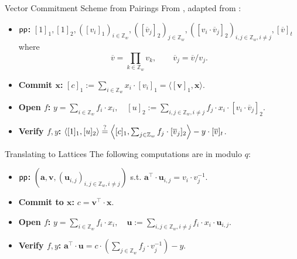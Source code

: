 \begin{frame}{Vector Commitment Scheme from Pairings}
	From \cite{AlbrechtCLMT22}, adapted from \cite{CatalanoF13, LibertRY16,LaiM19}:\pause
	\begin{itemize}
		\item \textbf{$\textsf{pp}$:} $[1]_1, [1]_2, ([v_i]_1)_{i\in \mathbb{Z}_w}, ([\overline{v}_j]_2)_{j \in \mathbb{Z}_w}, ([v_i \cdot \overline{v}_j]_2)_{i, j \in \mathbb{Z}_w, i\not=j}, [\overline{v}]_t$ where 
		\begin{equation*}
			\overline{v} = \prod_{k \in \mathbb{Z}_w}v_k,\qquad \overline{v}_j = \overline{v}/v_j.
		\end{equation*}\pause
		\item \textbf{Commit $\mathbf{x}$:} $[c]_1 := \sum_{i \in \mathbb{Z}_w} x_i \cdot [v_i]_1 = \langle[\mathbf{v}]_1, \mathbf{x}\rangle$.\pause
		\item \textbf{Open $f$:} $y = \sum_{i \in \mathbb{Z}_w}f_i\cdot x_i,\quad [u]_2 := \sum_{i,j \in \mathbb{Z}_w, i\not=j}f_j\cdot x_i\cdot[v_i\cdot\overline{v}_j]_2$.\pause
		\item \textbf{Verify $f, y$:} $\langle[1]_1, [u]_2\rangle \stackrel{?}{=} \left\langle[c]_1, \sum_{j \in \mathbb{Z}_w}f_j\cdot [\overline{v}_j]_2\right\rangle - y \cdot [\overline{v}]_t$.
	\end{itemize}
\end{frame}
\begin{frame}{Translating to Lattices}
	The following computations are in modulo $q$:\pause
	\begin{itemize}
		\item \textbf{$\textsf{pp}$:} $\left(\mathbf{a}, \mathbf{v}, (\mathbf{u}_{i,j})_{i,j\in \mathbb{Z}_w, i\not=j}\right)$ s.t. $\mathbf{a}^\top\cdot \mathbf{u}_{i,j} = v_i \cdot v_j^{-1}$.\pause
		\item \textbf{Commit to $\mathbf{x}$:} $c = \mathbf{v}^\top\cdot\mathbf{x}$.\pause
		\item \textbf{Open $f$:} $y = \sum_{i \in \mathbb{Z}_w}f_i\cdot x_i,\quad \mathbf{u}:=\sum_{i,j \in \mathbb{Z}_w, i\not=j}f_i\cdot x_i\cdot \mathbf{u}_{i,j}$.\pause
		\item \textbf{Verify $f, y$:} $\mathbf{a}^\top\cdot\mathbf{u} = c\cdot \left(\sum_{j \in \mathbb{Z}_w}f_j\cdot v_j^{-1}\right) -y.$
	\end{itemize}
\end{frame}